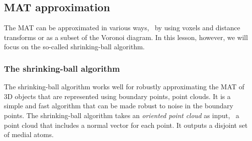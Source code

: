 \subsection{MAT approximation}
The MAT can be approximated in various ways, \eg~by using voxels and distance transforms or as a subset of the Voronoi diagram.
In this lesson, however, we will focus on the so-called shrinking-ball algorithm.

\subsubsection{The shrinking-ball algorithm}
The shrinking-ball algorithm works well for robustly approximating the MAT of 3D objects that are represented using boundary points, \ie point clouds.
It is a simple and fast algorithm that can be made robust to noise in the boundary points.
The shrinking-ball algorithm takes an \emph{oriented point cloud} as input, \ie\ a point cloud that includes a normal vector for each point. 
It outputs a disjoint set of medial atoms. 

